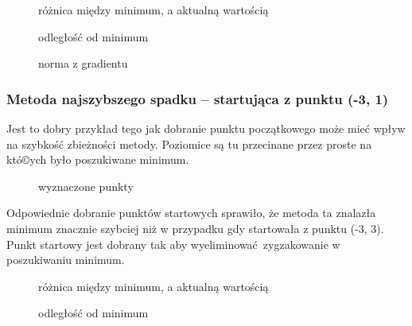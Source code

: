 \documentclass[a4paper, 10pt]{article}
\begin{document}
			 \begin{figure}[H]
			 	\centering
			 	\def \svgwidth{0.75\columnwidth}
			 	
			 	\caption{różnica między minimum, a aktualną wartością}
			 \end{figure}\noindent
			 
			 \begin{figure}[H]
			 	\centering
			 	\def \svgwidth{0.75\columnwidth}
			 	
			 	\caption{odległość od minimum}
			 \end{figure}\noindent
			\begin{figure}[H]
				\centering
				\def \svgwidth{0.75\columnwidth}
				
				\caption{norma z gradientu}
			\end{figure}\noindent
			
			
			\subsubsection{Metoda najszybszego spadku -- startująca z punktu (-3, 1)}
				Jest to dobry przykład tego jak dobranie punktu początkowego może mieć wpływ na szybkość zbieżności metody. Poziomice są tu przecinane przez proste na któ©ych było poszukiwane minimum.
			    \begin{figure}[H]
			        \centering
			        \def \svgwidth{0.75\columnwidth}
			        
			        \caption{wyznaczone punkty}
			    \end{figure}\noindent
				Odpowiednie dobranie punktów startowych sprawiło, że metoda ta znalazła minimum znacznie szybciej niż w przypadku gdy startowała z punktu (-3, 3). Punkt startowy jest dobrany tak aby wyeliminować zygzakowanie w poszukiwaniu minimum.
			
			    \begin{figure}[H]
			        \centering
			        \def \svgwidth{0.75\columnwidth}
			        
			        \caption{różnica między minimum, a aktualną wartością}
			    \end{figure}\noindent
			
			
			    \begin{figure}[H]
			        \centering
			        \def \svgwidth{0.75\columnwidth}
			        
			        \caption{odległość od minimum}
			    \end{figure}\noindent
			    
\end{document}
